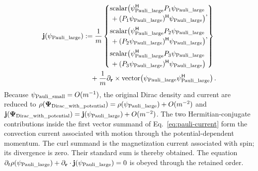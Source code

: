 \documentclass[10pt,letterpaper]{article}
\let\STAamsmathtext\text
\newcommand{\eqtext}[1]{\STAamsmathtext{\normalfont\rmfamily #1}}
\newcommand{\eqfunc}[1]{\operatorname{#1}}
\renewcommand{\text}[1]{\STAamsmathtext{\normalfont\rmfamily #1}}
\newcommand{\pv}[1]{#1}
\newcommand{\vct}[1]{\mathbf{#1}}
\newcommand{\bPsi}{\pv{\bm{\Psi}}}
\newcommand{\delop}{\partial}
\newcommand{\delr}{\delop_{\vct{r}}}
\newcommand{\gradv}{\delr}
\newcommand{\Hop}{\mathsf H}
\newcommand{\herm}[1]{#1^{\Hop}}
\newcommand{\vthreeeq}[3]{%
  \left\{%
  \begin{aligned}
  & #1,\\[0.12em]
  & #2,\\[0.12em]
  & #3
  \end{aligned}%
  \right\}%
}
\begin{document}
\begin{equation}
\begin{aligned}
\vct{j}(\pv{\psi}_{\eqtext{Pauli\_large}})
&:=\frac{1}{m}
\vthreeeq
{\begin{gathered}
\eqfunc{scalar}\!\left(
\herm{\pv{\psi}_{\eqtext{Pauli\_large}}}
P_1\pv{\psi}_{\eqtext{Pauli\_large}}\right.\\[-0.2em]
\left.{}+\herm{(P_1\pv{\psi}_{\eqtext{Pauli\_large}})}
\pv{\psi}_{\eqtext{Pauli\_large}}
\right)
\end{gathered}}
{\begin{gathered}
\eqfunc{scalar}\!\left(
\herm{\pv{\psi}_{\eqtext{Pauli\_large}}}
P_2\pv{\psi}_{\eqtext{Pauli\_large}}\right.\\[-0.2em]
\left.{}+\herm{(P_2\pv{\psi}_{\eqtext{Pauli\_large}})}
\pv{\psi}_{\eqtext{Pauli\_large}}
\right)
\end{gathered}}
{\begin{gathered}
\eqfunc{scalar}\!\left(
\herm{\pv{\psi}_{\eqtext{Pauli\_large}}}
P_3\pv{\psi}_{\eqtext{Pauli\_large}}\right.\\[-0.2em]
\left.{}+\herm{(P_3\pv{\psi}_{\eqtext{Pauli\_large}})}
\pv{\psi}_{\eqtext{Pauli\_large}}
\right)
\end{gathered}}\\
&\quad+\frac{1}{m}\gradv\times
\eqfunc{vector}\!\left(
\pv{\psi}_{\eqtext{Pauli\_large}}
\herm{\pv{\psi}_{\eqtext{Pauli\_large}}}
\right).
\label{eq:pauli-current}
\end{aligned}
\end{equation}
Because \(\pv{\psi}_{\eqtext{Pauli\_small}}=O(m^{-1})\), the original Dirac
density and current are reduced to
\(\rho(\bPsi_{\eqtext{Dirac\_with\_potential}})
=\rho(\pv{\psi}_{\eqtext{Pauli\_large}})+O(m^{-2})\) and
\(\vct{j}(\bPsi_{\eqtext{Dirac\_with\_potential}})
=\vct{j}(\pv{\psi}_{\eqtext{Pauli\_large}})+O(m^{-2})\).
The two Hermitian-conjugate contributions inside the first vector summand of
Eq.\ \eqref{eq:pauli-current} form the convection current associated with
motion through the potential-dependent momentum. The curl summand is the
magnetization current associated with spin; its divergence is zero. Their
standard sum is thereby obtained. The equation
\(\partial_t\rho(\pv{\psi}_{\eqtext{Pauli\_large}})
+\gradv\cdot\vct{j}(\pv{\psi}_{\eqtext{Pauli\_large}})=0\)
is obeyed through the retained order.
\end{document}
